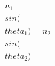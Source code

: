 \documentclass[preview]{standalone}
\begin{document}
\begin{align*}
n_1 \\sin(\\theta_1) = n_2 \\sin(\\theta_2)
\end{align*}
\end{document}
